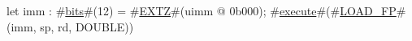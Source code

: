 let imm : #\hyperref[sailRISCVzbits]{bits}#(12) = #\hyperref[sailRISCVzEXTZ]{EXTZ}#(uimm @ 0b000);
#\hyperref[sailRISCVzexecute]{execute}#(#\hyperref[sailRISCVzLOADzyFP]{LOAD\_FP}#(imm, sp, rd, DOUBLE))
